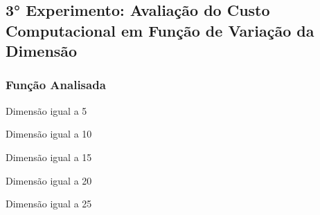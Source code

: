 

\subsection{3° Experimento: Avaliação do Custo Computacional em Função de Variação da Dimensão}
    \subsubsection{Função Analisada}

        \begin{minipage}[h!]{\linewidth}
            \centering
            Dimensão igual a 5
            \label{tab:tblo} 
            \writetable{\tblo}\par
            \bigskip
            \centering
            Dimensão igual a 10
            \label{tab:tblp} 
            \writetable{\tblp}\par
            \bigskip
            \centering
            Dimensão igual a 15
            \label{tab:tblq} 
            \writetable{\tblq}\par
            \bigskip
            \centering
            Dimensão igual a 20
            \label{tab:tblr} 
            \writetable{\tblr}\par
            \bigskip
            \centering
            Dimensão igual a 25
            \label{tab:tbls} 
            \writetable{\tbls}
        \end{minipage}
    
\newpage